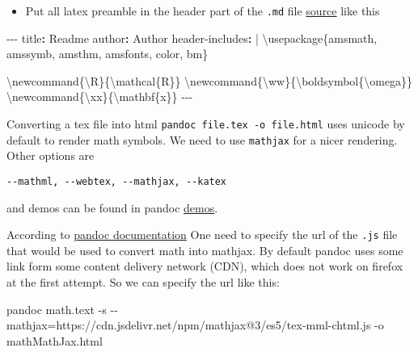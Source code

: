 \documentclass[
]{article}
\newenvironment{Shaded}{}{}
\newcommand{\AttributeTok}[1]{\textcolor[rgb]{0.49,0.56,0.16}{#1}}
\newcommand{\CharTok}[1]{\textcolor[rgb]{0.25,0.44,0.63}{#1}}
\newcommand{\ExtensionTok}[1]{#1}
\newcommand{\FunctionTok}[1]{\textcolor[rgb]{0.02,0.16,0.49}{#1}}
\newcommand{\KeywordTok}[1]{\textcolor[rgb]{0.00,0.44,0.13}{\textbf{#1}}}
\newcommand{\NormalTok}[1]{#1}
\newcommand{\OperatorTok}[1]{\textcolor[rgb]{0.40,0.40,0.40}{#1}}
\newcommand{\PreprocessorTok}[1]{\textcolor[rgb]{0.74,0.48,0.00}{#1}}
\providecommand{\tightlist}{%
  \setlength{\itemsep}{0pt}\setlength{\parskip}{0pt}}
\begin{document}
\begin{itemize}
\tightlist
\item
  Put all latex preamble in the header part of the \texttt{.md} file
  \href{https://pandoc.org/MANUAL.html\#extension-yaml_metadata_block}{source}
  like this
\end{itemize}

\begin{Shaded}
\begin{Highlighting}[]
\PreprocessorTok{{-}{-}{-}}
\FunctionTok{title}\KeywordTok{:}\AttributeTok{ Readme}
\FunctionTok{author}\KeywordTok{:}\AttributeTok{ Author}
\FunctionTok{header{-}includes}\KeywordTok{: }\CharTok{|}
\NormalTok{    \textbackslash{}usepackage\{amsmath, amssymb, amsthm, amsfonts, color, bm\}}

\NormalTok{    \textbackslash{}newcommand\{\textbackslash{}R\}\{\textbackslash{}mathcal\{R\}\}}
\NormalTok{    \textbackslash{}newcommand\{\textbackslash{}ww\}\{\textbackslash{}boldsymbol\{\textbackslash{}omega\}\}}
\NormalTok{    \textbackslash{}newcommand\{\textbackslash{}xx\}\{\textbackslash{}mathbf\{x\}\}}
\PreprocessorTok{{-}{-}{-}}
\end{Highlighting}
\end{Shaded}

Converting a tex file into html \texttt{pandoc\ file.tex\ -o\ file.html}
uses unicode by default to render math symbols. We need to use
\texttt{mathjax} for a nicer rendering. Other options are

\begin{verbatim}
--mathml, --webtex, --mathjax, --katex
\end{verbatim}

and demos can be found in pandoc
\href{https://pandoc.org/demos.html}{demos}.

According to
\href{https://pandoc.org/chunkedhtml-demo/3.6-math-rendering-in-html.html}{pandoc
documentation} One need to specify the url of the \texttt{.js} file that
would be used to convert math into mathjax. By default pandoc uses some
link form some content delivery network (CDN), which does not work on
firefox at the first attempt. So we can specify the url like this:

\begin{Shaded}
\begin{Highlighting}[]
\ExtensionTok{pandoc}\NormalTok{ math.text }\AttributeTok{{-}s} \AttributeTok{{-}{-}mathjax}\OperatorTok{=}\NormalTok{https://cdn.jsdelivr.net/npm/mathjax@3/es5/tex{-}mml{-}chtml.js }\AttributeTok{{-}o}\NormalTok{   mathMathJax.html}
\end{Highlighting}
\end{Shaded}
\end{document}
